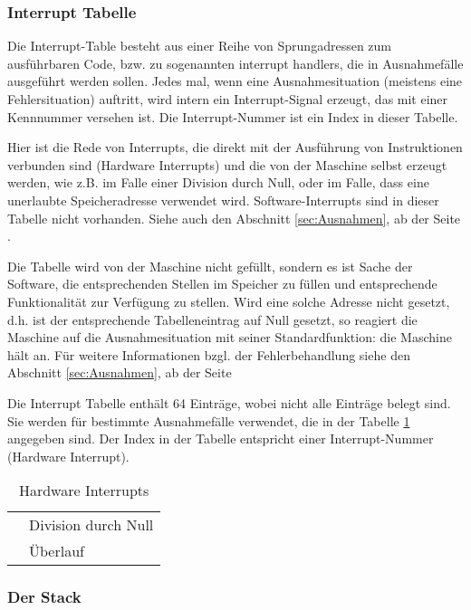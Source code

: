 \subsubsection{Interrupt Tabelle}

Die Interrupt-Table besteht aus einer Reihe von Sprungadressen zum ausführbaren
Code, bzw. zu sogenannten \glqq interrupt handlers\grqq, die in Ausnahmefälle
ausgeführt werden sollen. Jedes mal, wenn eine Ausnahmesituation (meistens eine
Fehlersituation) auftritt, wird intern ein Interrupt-Signal erzeugt, das mit
einer Kennnummer versehen ist. Die Interrupt-Nummer ist ein Index in dieser
Tabelle.

Hier ist die Rede von Interrupts, die direkt mit der Ausführung von
Instruktionen verbunden sind (Hardware Interrupts) und die von der Maschine
selbst erzeugt werden, wie z.B. im Falle einer Division durch Null, oder im
Falle, dass eine unerlaubte Speicheradresse verwendet wird. Software-Interrupts
sind in dieser Tabelle nicht vorhanden. Siehe auch den Abschnitt
\ref{sec:Ausnahmen}, ab der Seite \pageref{sec:Ausnahmen}.


Die Tabelle wird von der Maschine nicht gefüllt, sondern es ist Sache der
Software, die entsprechenden Stellen im Speicher zu füllen und entsprechende
Funktionalität zur Verfügung zu stellen. Wird eine solche Adresse nicht gesetzt,
d.h. ist der entsprechende Tabelleneintrag auf Null gesetzt, so reagiert die
Maschine auf die Ausnahmesituation mit seiner Standardfunktion: die Maschine
hält an. Für weitere Informationen bzgl. der Fehlerbehandlung siehe den
Abschnitt \ref{sec:Ausnahmen}, ab der Seite \pageref{sec:Ausnahmen}

Die Interrupt Tabelle enthält 64 Einträge, wobei nicht alle Einträge belegt
sind. Sie werden für bestimmte Ausnahmefälle verwendet, die in der Tabelle
\ref{tab:Hardware-Interrupts} angegeben sind. Der Index in der Tabelle
entspricht einer Interrupt-Nummer (Hardware Interrupt).

\begin{longtable}{>{\ttfamily}ll}
\caption{Hardware Interrupts}
\label{tab:Hardware-Interrupts}
\\\toprule
 0 & Division durch Null \\
 1 & Überlauf
\\\bottomrule
\end{longtable}



\subsubsection{Der Stack}
\label{subsubsec:Stack}


